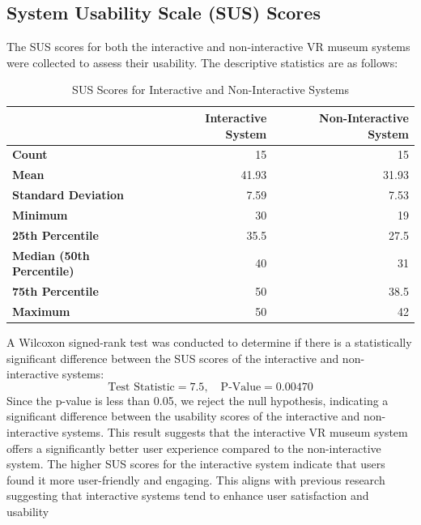 \documentclass[conference]{IEEEtran}
\begin{document}
\subsection{System Usability Scale (SUS) Scores}
The SUS scores for both the interactive and non-interactive VR museum systems were collected to assess their usability. The descriptive statistics are as follows:
\begin{table}[h]
    \centering
    \begin{tabular}{|l|r|r|}
    \hline
                             & \textbf{Interactive System} & \textbf{Non-Interactive System} \\ \hline
    \textbf{Count}           & 15                          & 15                              \\ \hline
    \textbf{Mean}            & 41.93                       & 31.93                           \\ \hline
    \textbf{Standard Deviation} & 7.59                       & 7.53                            \\ \hline
    \textbf{Minimum}         & 30                          & 19                              \\ \hline
    \textbf{25th Percentile} & 35.5                        & 27.5                            \\ \hline
    \textbf{Median (50th Percentile)} & 40                 & 31                              \\ \hline
    \textbf{75th Percentile} & 50                          & 38.5                            \\ \hline
    \textbf{Maximum}         & 50                          & 42                              \\ \hline
    \end{tabular}
    \caption{SUS Scores for Interactive and Non-Interactive Systems}
\end{table}

A Wilcoxon signed-rank test was conducted to determine if there is a statistically significant difference between the SUS scores of the interactive and non-interactive systems:
\[
\text{Test Statistic} = 7.5, \quad \text{P-Value} = 0.00470
\]
Since the p-value is less than 0.05, we reject the null hypothesis, indicating a significant
difference between the usability scores of the interactive and non-interactive systems. This result suggests that the interactive VR museum system offers a significantly better user experience compared to the non-interactive system. The higher SUS scores for the interactive system indicate that users found it more user-friendly and engaging. This aligns with previous research suggesting that interactive systems tend to enhance user satisfaction and usability
\end{document}
